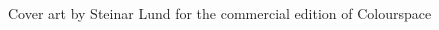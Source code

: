 \clearpage
\begin{figure}[H]
    \centering
    \begin{adjustbox}{width=12cm,center}
    \end{adjustbox}
\caption{Cover art by Steinar Lund for the commercial edition of Colourspace}
\end{figure}
\clearpage
